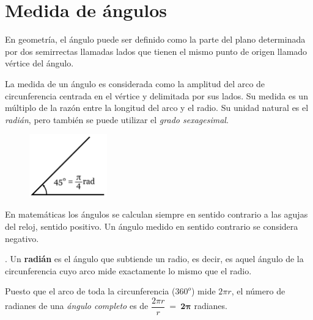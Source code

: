\vspace{0.5cm}
\section{Medida de ángulos}
\vspace{0.5cm}


\begin{definition}

En geometría, el ángulo puede ser definido como la parte del plano determinada por dos semirrectas llamadas lados que tienen el mismo punto de origen llamado vértice del ángulo. 
\begin{multicols}{2}
La medida de un ángulo es considerada como la amplitud del arco de circunferencia centrada en el vértice y delimitada por sus lados. Su medida es un múltiplo de la razón entre la longitud del arco y el radio. Su unidad natural es el \emph{radián}, pero también se puede utilizar el \emph{grado sexagesimal}.
\begin{figure}[H]
	\centering
	\includegraphics[width=0.3\textwidth]{img-rt/rt02.png}
\end{figure}
\end{multicols}

En matemáticas  los ángulos se calculan siempre en sentido contrario a las agujas del reloj, sentido positivo. Un ángulo medido en sentido contrario se considera negativo.
\end{definition}

\vspace{5mm}
\begin{definition}[ Radián]
	. Un \textbf{radián} es el ángulo que subtiende un radio, es decir, es aquel ángulo de la circunferencia cuyo arco mide exactamente lo mismo que el radio.
\end{definition}

Puesto que el arco de toda la circunferencia ($360^o$) mide $2\pi r$, el número de radianes de una \emph{ángulo completo} es de $\dfrac{2\pi r}{r} \ = \ \boldsymbol{ 2\pi }$ radianes.

